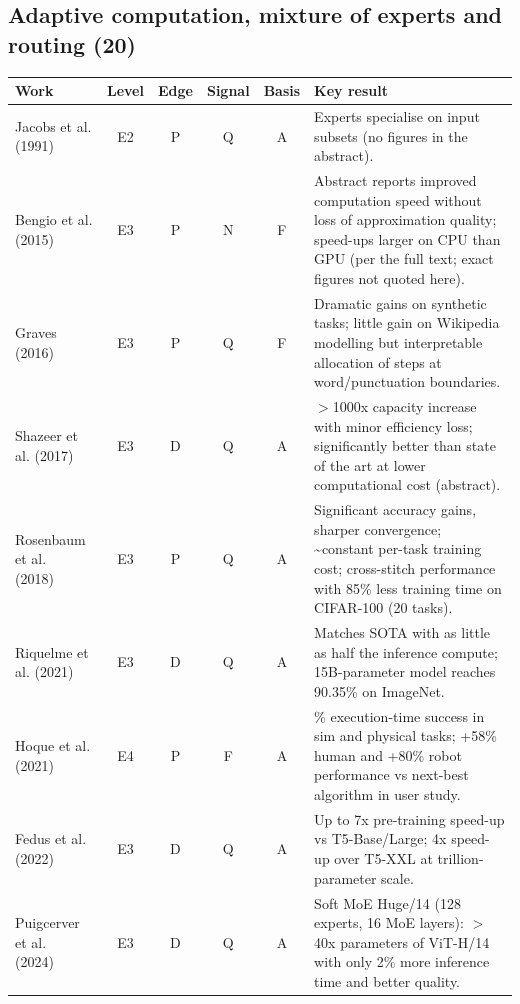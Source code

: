 \documentclass[10pt,a4paper]{article}
\begin{document}
\subsection*{Adaptive computation, mixture of experts and routing (20)}
\begin{longtable}{@{}>{\raggedright\arraybackslash}p{4.0cm}cccc>{\raggedright\arraybackslash}p{7.6cm}@{}}
\toprule \textbf{Work} & \textbf{Level} & \textbf{Edge} & \textbf{Signal} & \textbf{Basis} & \textbf{Key result} \\ \midrule \endhead
Jacobs et al. (1991)~\cite{Jacobs1991} & E2 & P & Q & A & Experts specialise on input subsets (no figures in the abstract). \\
Bengio et al. (2015)~\cite{Bengio2015} & E3 & P & N & F & Abstract reports improved computation speed without loss of approximation quality; speed-ups larger on CPU than GPU (per the full text; exact figures not quoted here). \\
Graves (2016)~\cite{Graves2016} & E3 & P & Q & F & Dramatic gains on synthetic tasks; little gain on Wikipedia modelling but interpretable allocation of steps at word/punctuation boundaries. \\
Shazeer et al. (2017)~\cite{Shazeer2017} & E3 & D & Q & A & $>$1000x capacity increase with minor efficiency loss; significantly better than state of the art at lower computational cost (abstract). \\
Rosenbaum et al. (2018)~\cite{Rosenbaum2018} & E3 & P & Q & A & Significant accuracy gains, sharper convergence; \textasciitilde{}constant per-task training cost; cross-stitch performance with 85\% less training time on CIFAR-100 (20 tasks). \\
Riquelme et al. (2021)~\cite{Riquelme2021} & E3 & D & Q & A & Matches SOTA with as little as half the inference compute; 15B-parameter model reaches 90.35\% on ImageNet. \\
Hoque et al. (2021)~\cite{Hoque2021} & E4 & P & F & A & 100\% execution-time success in sim and physical tasks; +58\% human and +80\% robot performance vs next-best algorithm in user study. \\
Fedus et al. (2022)~\cite{Fedus2022} & E3 & D & Q & A & Up to 7x pre-training speed-up vs T5-Base/Large; 4x speed-up over T5-XXL at trillion-parameter scale. \\
Puigcerver et al. (2024)~\cite{Puigcerver2024} & E3 & D & Q & A & Soft MoE Huge/14 (128 experts, 16 MoE layers): $>$40x parameters of ViT-H/14 with only 2\% more inference time and better quality. \\

\end{longtable}
\end{document}

